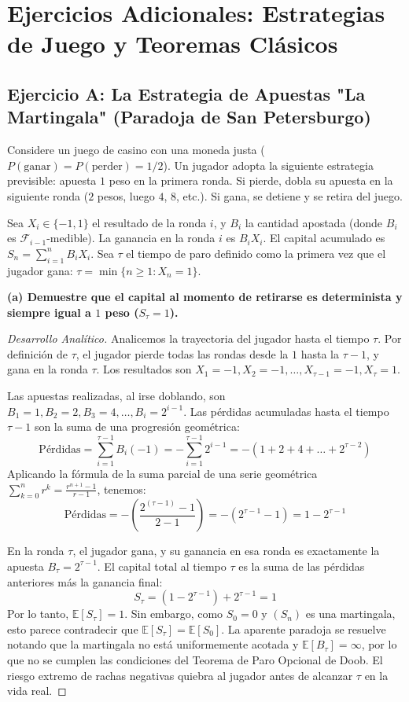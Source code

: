 \documentclass[12pt, a4paper]{article}
\begin{document}
\vspace{0.5cm}

\section{Ejercicios Adicionales: Estrategias de Juego y Teoremas Clásicos}

\subsection{Ejercicio A: La Estrategia de Apuestas "La Martingala" (Paradoja de San Petersburgo)}
Considere un juego de casino con una moneda justa ($P(\text{ganar}) = P(\text{perder}) = 1/2$). Un jugador adopta la siguiente estrategia previsible: apuesta $1$ peso en la primera ronda. Si pierde, dobla su apuesta en la siguiente ronda ($2$ pesos, luego $4$, $8$, etc.). Si gana, se detiene y se retira del juego. 

Sea $X_i \in \{-1, 1\}$ el resultado de la ronda $i$, y $B_i$ la cantidad apostada (donde $B_i$ es $\mathcal{F}_{i-1}$-medible). La ganancia en la ronda $i$ es $B_i X_i$. El capital acumulado es $S_n = \sum_{i=1}^n B_i X_i$. Sea $\tau$ el tiempo de paro definido como la primera vez que el jugador gana: $\tau = \min\{n \ge 1 : X_n = 1\}$.

\vspace{0.3cm}
\noindent \textbf{(a) Demuestre que el capital al momento de retirarse es determinista y siempre igual a $1$ peso ($S_\tau = 1$).}

\begin{proof}[Desarrollo Analítico]
Analicemos la trayectoria del jugador hasta el tiempo $\tau$. Por definición de $\tau$, el jugador pierde todas las rondas desde la $1$ hasta la $\tau - 1$, y gana en la ronda $\tau$.
Los resultados son $X_1 = -1, X_2 = -1, \dots, X_{\tau-1} = -1, X_\tau = 1$.

Las apuestas realizadas, al irse doblando, son $B_1 = 1, B_2 = 2, B_3 = 4, \dots, B_i = 2^{i-1}$.
Las pérdidas acumuladas hasta el tiempo $\tau - 1$ son la suma de una progresión geométrica:
$$ \text{Pérdidas} = \sum_{i=1}^{\tau-1} B_i (-1) = - \sum_{i=1}^{\tau-1} 2^{i-1} = - (1 + 2 + 4 + \dots + 2^{\tau-2}) $$
Aplicando la fórmula de la suma parcial de una serie geométrica $\sum_{k=0}^{n} r^k = \frac{r^{n+1}-1}{r-1}$, tenemos:
$$ \text{Pérdidas} = - \left( \frac{2^{(\tau-1)} - 1}{2 - 1} \right) = - (2^{\tau-1} - 1) = 1 - 2^{\tau-1} $$

En la ronda $\tau$, el jugador gana, y su ganancia en esa ronda es exactamente la apuesta $B_\tau = 2^{\tau-1}$.
El capital total al tiempo $\tau$ es la suma de las pérdidas anteriores más la ganancia final:
$$ S_\tau = (1 - 2^{\tau-1}) + 2^{\tau-1} = 1 $$
Por lo tanto, $\mathbb{E}[S_\tau] = 1$. Sin embargo, como $S_0 = 0$ y $(S_n)$ es una martingala, esto parece contradecir que $\mathbb{E}[S_\tau] = \mathbb{E}[S_0]$. La aparente paradoja se resuelve notando que la martingala no está uniformemente acotada y $\mathbb{E}[B_\tau] = \infty$, por lo que no se cumplen las condiciones del Teorema de Paro Opcional de Doob. El riesgo extremo de rachas negativas quiebra al jugador antes de alcanzar $\tau$ en la vida real.
\end{proof}
\end{document}
